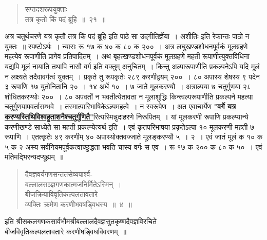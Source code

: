 \documentclass[11pt, openany]{book}
\begin{document}
\newpage

\begin{quote}
    \ex
 सप्तदशरूपयुक्ताः\\

\vspace{-7mm}
\hspace{1cm} तत्र कृतो किं पदं ब्रूहि~॥~२१~॥ 
\end{quote}

 अत्र चतुर्थचरणे यत्र कृतौ तत्र किं पदं ब्रूहि इति 
पाठे सा उद्गीतिर्ज्ञेया~। अशीतिः इति रेफान्तः पाठो न युक्तः~॥
स्पष्टोऽर्थः~। न्यासः रू १७ क ४० क ८० क २००~। अत्र \;लघुखण्डशोधनपूर्वकं \;मूलग्रहणे \;महत्येव \;रूपाणीति \;प्रागेव \;प्रतिपादितम्~। अथ बृहत्खण्डशोधनपूर्वकं मूलग्रहणे महती रूपाणीत्युक्तविधिना यद्यपि मूलं नायाति तथापि नासौ वर्ग इति वक्तुम् अनुचितम्~। किन्तु अल्पारूपाणीति प्रकल्पनेऽपि यदि मूलं न लक्ष्यते तदैवावर्गत्वं युक्तम्~। प्रकृते तु रूपकृतेः २८९ 
करणीद्वयम् २००~। ८० अपास्य शेषस्य ९ पदेन ३ रूपाणि १७ युतोनितानि २०~। १४ अर्धे १०~। ७ जाते मूलकरण्यौ~। अत्राल्पया ७ 
चतुर्गुणया २८ शोधितकरण्योः २००~। ८० अपवर्तो न भवतीत्येतावता न 
मूलाशुद्धिः किन्त्वल्परूपाणीति प्रकल्पने महत्या चतुर्गुणयापवर्तासम्भवे~। तस्मात्पारिभाषिकेऽल्पमहत्वे~। न स्वरूपेण~। अत एवाचार्येण \hyperref[ex 29]{\textbf{"वर्गे यत्र करण्यस्तिथिविश्वहुताशनैश्चतुर्गुणितै"}}रित्यस्मिन्नुदाहरणे
निरूपितम्~। यां मूलकरणी रूपाणि प्रकल्प्यान्ये करणीखण्डे साध्येते सा महती
प्रकल्प्येत्यर्थ इति~। एवं कृतपरिभाषया प्रकृतेऽल्पा १० मूलकरणी महती ७ रूपाणि~। एतत्कृतेः ४९ करणीम् ४० अपास्योक्तवज्जाते मूलङ्करण्यौ ५~। २~। एवं 
जातं मूलं क १० क ५ क २ अस्य सर्वनियमपूर्वकत्वाच्छुद्धता भवति 
चास्य वर्गः स एव~। रू १७ क २०० क ८० क ५०~। एवं मतिमद्भिरन्यदप्यूह्यम्~॥ 
\begin{quote}
    \qt
     दैवज्ञवर्यगणसन्ततसेव्यपार्श्व- \\

\vspace{-7mm}
\hspace{1cm} बल्लालसञ्ज्ञगणकात्मजनिर्मितेऽस्मिन्~। \\

 \vspace{-7mm}
 बीजक्रियाविवृतिकल्पलतावतारे \\

\vspace{-7mm}
\hspace{1cm} व्यक्तिः क्रमेण करणीभवषड्विधस्य~॥~४~॥
\end{quote}
\newpage%

 \begin{center}
 इति श्रीसकलगणकसार्वभौमश्रीबल्लालदैवज्ञसुतकृष्णदैवज्ञविरचिते \\
बीजविवृतिकल्पलतावतारे करणीषड्विधविवरणम्~॥ 
 \end{center}
\end{document}
